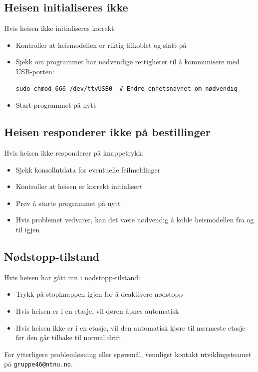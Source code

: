 \subsection{Heisen initialiseres ikke}
Hvis heisen ikke initialiseres korrekt:
\begin{itemize}
    \item Kontroller at heismodellen er riktig tilkoblet og slått på
    \item Sjekk om programmet har nødvendige rettigheter til å kommunisere med USB-porten:
    \begin{lstlisting}[style=cpp]
    sudo chmod 666 /dev/ttyUSB0  # Endre enhetsnavnet om nødvendig
    \end{lstlisting}
    \item Start programmet på nytt
\end{itemize}

\subsection{Heisen responderer ikke på bestillinger}
Hvis heisen ikke responderer på knappetrykk:
\begin{itemize}
    \item Sjekk konsollutdata for eventuelle feilmeldinger
    \item Kontroller at heisen er korrekt initialisert
    \item Prøv å starte programmet på nytt
    \item Hvis problemet vedvarer, kan det være nødvendig å koble heismodellen fra og til igjen
\end{itemize}

\subsection{Nødstopp-tilstand}
Hvis heisen har gått inn i nødstopp-tilstand:
\begin{itemize}
    \item Trykk på stopknappen igjen for å deaktivere nødstopp
    \item Hvis heisen er i en etasje, vil døren åpnes automatisk
    \item Hvis heisen ikke er i en etasje, vil den automatisk kjøre til nærmeste etasje før den går tilbake til normal drift
\end{itemize}

For ytterligere problemløsning eller spørsmål, vennligst kontakt utviklingsteamet på \texttt{gruppe46@ntnu.no}.
